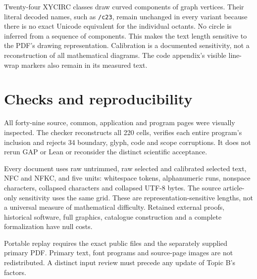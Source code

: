 \documentclass[11pt,a4paper]{article}
\begin{document}
Twenty-four XYCIRC classes draw curved components of graph vertices. Their literal decoded names, such as \texttt{/c23}, remain unchanged in every variant because there is no exact Unicode equivalent for the individual octants. No circle is inferred from a sequence of components. This makes the text length sensitive to the PDF's drawing representation. Calibration is a documented sensitivity, not a reconstruction of all mathematical diagrams. The code appendix's visible line-wrap markers also remain in its measured text.

\section*{Checks and reproducibility}
All forty-nine source, common, application and program pages were visually inspected. The checker reconstructs all 220 cells, verifies each entire program's inclusion and rejects 34 boundary, glyph, code and scope corruptions. It does not rerun GAP or Lean or reconsider the distinct scientific acceptance.

Every document uses raw untrimmed, raw selected and calibrated selected text, NFC and NFKC, and five units: whitespace tokens, alphanumeric runs, nonspace characters, collapsed characters and collapsed UTF-8 bytes. The source article-only sensitivity uses the same grid. These are representation-sensitive lengths, not a universal measure of mathematical difficulty. Retained external proofs, historical software, full graphics, catalogue construction and a complete formalization have null costs.

Portable replay requires the exact public files and the separately supplied primary PDF. Primary text, font programs and source-page images are not redistributed. A distinct input review must precede any update of Topic B's factors.
\end{document}
